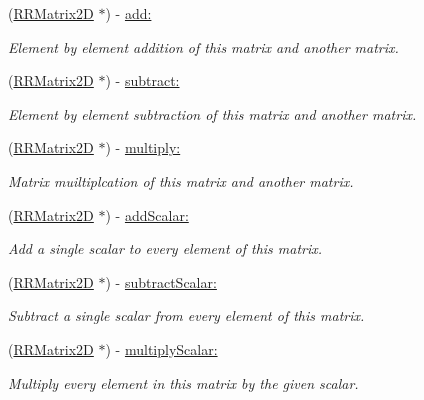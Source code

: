 \begin{DoxyCompactItemize}
(\hyperlink{interface_r_r_matrix2_d}{R\-R\-Matrix2\-D} $\ast$) -\/ \hyperlink{interface_r_r_matrix2_d_a6a6b1aed8f197f37a6fb225a4621f843}{add\-:}
\begin{DoxyCompactList}\small\item\em Element by element addition of this matrix and another matrix. \end{DoxyCompactList}\item 
(\hyperlink{interface_r_r_matrix2_d}{R\-R\-Matrix2\-D} $\ast$) -\/ \hyperlink{interface_r_r_matrix2_d_a855feab78e14c68a8cbf1bba1c7fa510}{subtract\-:}
\begin{DoxyCompactList}\small\item\em Element by element subtraction of this matrix and another matrix. \end{DoxyCompactList}\item 
(\hyperlink{interface_r_r_matrix2_d}{R\-R\-Matrix2\-D} $\ast$) -\/ \hyperlink{interface_r_r_matrix2_d_af3176870decbecdcdd18d382085e3e6a}{multiply\-:}
\begin{DoxyCompactList}\small\item\em Matrix muiltiplcation of this matrix and another matrix. \end{DoxyCompactList}\item 
(\hyperlink{interface_r_r_matrix2_d}{R\-R\-Matrix2\-D} $\ast$) -\/ \hyperlink{interface_r_r_matrix2_d_a31d973e08150afbd0ff4f2681f49a818}{add\-Scalar\-:}
\begin{DoxyCompactList}\small\item\em Add a single scalar to every element of this matrix. \end{DoxyCompactList}\item 
(\hyperlink{interface_r_r_matrix2_d}{R\-R\-Matrix2\-D} $\ast$) -\/ \hyperlink{interface_r_r_matrix2_d_a31152b4618cc5bc798919294ece49ae8}{subtract\-Scalar\-:}
\begin{DoxyCompactList}\small\item\em Subtract a single scalar from every element of this matrix. \end{DoxyCompactList}\item 
(\hyperlink{interface_r_r_matrix2_d}{R\-R\-Matrix2\-D} $\ast$) -\/ \hyperlink{interface_r_r_matrix2_d_a959a7d0285b5bc63d8d6ae7903a2452b}{multiply\-Scalar\-:}
\begin{DoxyCompactList}\small\item\em Multiply every element in this matrix by the given scalar. \end{DoxyCompactList}\item 

\end{DoxyCompactItemize}
